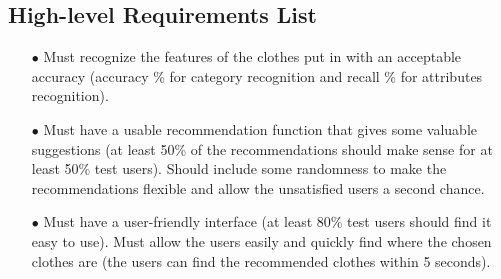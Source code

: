 \subsection{High-level Requirements List}
\begin{itemize}
   \item[$\bullet$] Must recognize the features of the clothes put in with an acceptable accuracy (accuracy \% for category recognition and recall \% for attributes recognition).
   \item[$\bullet$] Must have a usable recommendation function that gives some valuable suggestions (at least 50\% of the recommendations should make sense for at least 50\% test users). Should include some randomness to make the recommendations flexible and allow the unsatisfied users a second chance.
   \item[$\bullet$] Must have a user-friendly interface (at least 80\% test users should find it easy to use). Must allow the users easily and quickly find where the chosen clothes are (the users can find the recommended clothes within 5 seconds).
   \end{itemize}

